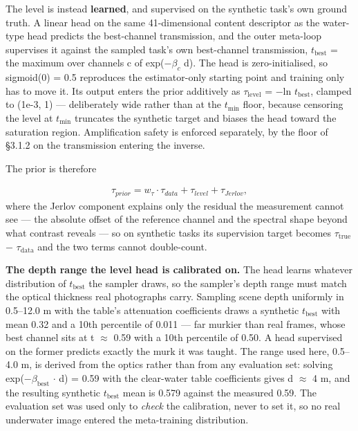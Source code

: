 \documentclass[journal]{IEEEtran}
\begin{document}
The level is instead \textbf{learned}, and supervised on the synthetic task's own ground truth. A linear head on the same 41-dimensional content descriptor as the water-type head predicts the best-channel transmission, and the outer meta-loop supervises it against the sampled task's own best-channel transmission, $t_{\mathrm{best}}$ = the maximum over channels c of exp($-$$\beta_c$ d). The head is zero-initialised, so sigmoid(0) = 0.5 reproduces the estimator-only starting point and training only has to move it. Its output enters the prior additively as $\tau_{\mathrm{level}}$ = $-$ln $t_{\mathrm{best}}$, clamped to (1e-3, 1) --- deliberately wide rather than at the $t_{\min}$ floor, because censoring the level at $t_{\min}$ truncates the synthetic target and biases the head toward the saturation region. Amplification safety is enforced separately, by the floor of \S{}3.1.2 on the transmission entering the inverse.

The prior is therefore

\begin{align}
\tau _{prior} = w_\tau  \cdot  \tau _{data} + \tau _{level} + \tau _{Jerlov},\label{eq:7} 
\end{align}
where the Jerlov component explains only the residual the measurement cannot see --- the absolute offset of the reference channel and the spectral shape beyond what contrast reveals --- so on synthetic tasks its supervision target becomes $\tau_{\mathrm{true}}$ $-$ $\tau_{\mathrm{data}}$ and the two terms cannot double-count.

\textbf{The depth range the level head is calibrated on.} The head learns whatever distribution of $t_{\mathrm{best}}$ the sampler draws, so the sampler's depth range must match the optical thickness real photographs carry. Sampling scene depth uniformly in 0.5--12.0 m with the table's attenuation coefficients draws a synthetic $t_{\mathrm{best}}$ with mean 0.32 and a 10th percentile of 0.011 --- far murkier than real frames, whose best channel sits at t $\approx$ 0.59 with a 10th percentile of 0.50. A head supervised on the former predicts exactly the murk it was taught. The range used here, 0.5--4.0 m, is derived from the optics rather than from any evaluation set: solving exp($-$$\beta_{\mathrm{best}}$ $\cdot$ d) = 0.59 with the clear-water table coefficients gives d $\approx$ 4 m, and the resulting synthetic $t_{\mathrm{best}}$ mean is 0.579 against the measured 0.59. The evaluation set was used only to \emph{check} the calibration, never to set it, so no real underwater image entered the meta-training distribution.
\end{document}
